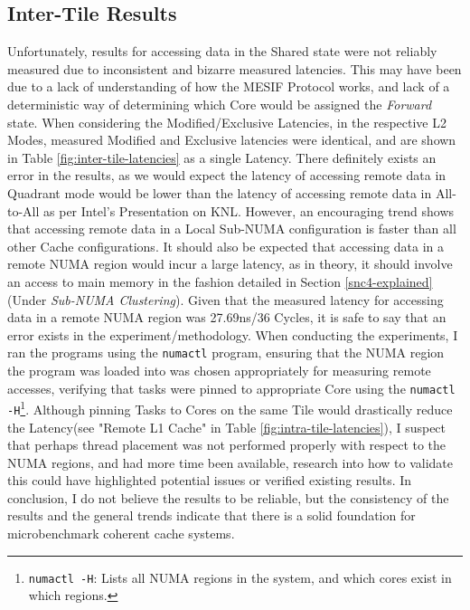\documentclass[bsc,frontabs,twoside,singlespacing,parskip,deptreport]{infthesis}     %
\begin{document}
\subsection{Inter-Tile Results}
Unfortunately, results for accessing data in the Shared state were not reliably measured due to inconsistent and bizarre measured latencies. This may have been due to a lack of understanding of how the MESIF Protocol works, and lack of a deterministic way of determining which Core would be assigned the \emph{Forward} state. When considering the Modified/Exclusive Latencies, in the respective L2 Modes, measured Modified and Exclusive latencies were identical, and are shown in Table \ref{fig:inter-tile-latencies} as a single Latency. There definitely exists an error in the results, as we would expect the latency of accessing remote data in Quadrant mode would be lower than the latency of accessing remote data in All-to-All as per Intel's Presentation on KNL\cite{intel_pres}. However, an encouraging trend shows that accessing remote data in a Local Sub-NUMA configuration is faster than all other Cache configurations. It should also be expected that accessing data in a remote NUMA region would incur a large latency, as in theory, it should involve an access to main memory in the fashion detailed in Section \ref{snc4-explained}(Under \textit{Sub-NUMA Clustering}). Given that the measured latency for accessing data in a remote NUMA region was 27.69ns/36 Cycles, it is safe to say that an error exists in the experiment/methodology. When conducting the experiments, I ran the programs using the \texttt{numactl} program, ensuring that the NUMA region the program was loaded into was chosen appropriately for measuring remote accesses, verifying that tasks were pinned to appropriate Core using the \texttt{numactl -H}\footnote{\texttt{numactl -H}: Lists all NUMA regions in the system, and which cores exist in which regions.}. Although pinning Tasks to Cores on the same Tile would drastically reduce the Latency(see "Remote L1 Cache" in Table \ref{fig:intra-tile-latencies}), I suspect that perhaps thread placement was not performed properly with respect to the NUMA regions, and had more time been available, research into how to validate this could have highlighted potential issues or verified existing results. In conclusion, I do not believe the results to be reliable, but the consistency of the results and the general trends indicate that there is a solid foundation for microbenchmark coherent cache systems.
\end{document}
